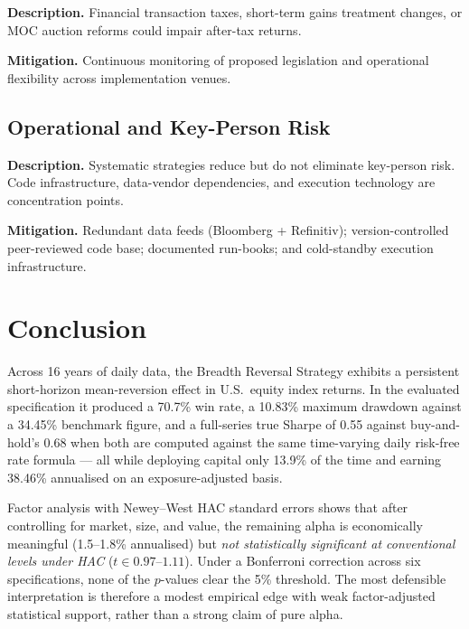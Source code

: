 \documentclass[11pt]{article}
\begin{document}
\textbf{Description.} Financial transaction taxes, short-term gains
treatment changes, or MOC auction reforms could impair after-tax returns.

\textbf{Mitigation.} Continuous monitoring of proposed legislation and
operational flexibility across implementation venues.

\subsection{Operational and Key-Person Risk}

\textbf{Description.} Systematic strategies reduce but do not eliminate
key-person risk. Code infrastructure, data-vendor dependencies, and
execution technology are concentration points.

\textbf{Mitigation.} Redundant data feeds (Bloomberg + Refinitiv);
version-controlled peer-reviewed code base; documented run-books; and
cold-standby execution infrastructure.

\newpage

\section{Conclusion}

Across 16 years of daily data, the Breadth Reversal Strategy exhibits a
persistent short-horizon mean-reversion effect in U.S.\ equity index
returns. In the evaluated specification it
produced a 70.7\% win rate, a 10.83\% maximum drawdown against a 34.45\%
benchmark figure, and a full-series true Sharpe of 0.55 against buy-and-hold's
0.68 when both are computed against the same time-varying daily risk-free
rate formula --- all while deploying capital only 13.9\% of the time and
earning 38.46\% annualised on an exposure-adjusted basis.

Factor analysis with Newey--West HAC standard
errors shows that after controlling for market, size, and value,
the remaining alpha is
economically meaningful (1.5--1.8\% annualised) but \emph{not
statistically significant at conventional levels under HAC}
($t \in 0.97$--$1.11$). Under a Bonferroni correction across six
specifications, none of the $p$-values clear the 5\% threshold. The most
defensible interpretation is therefore a modest empirical edge with weak
factor-adjusted statistical support, rather than a strong claim of pure
alpha.
\end{document}
